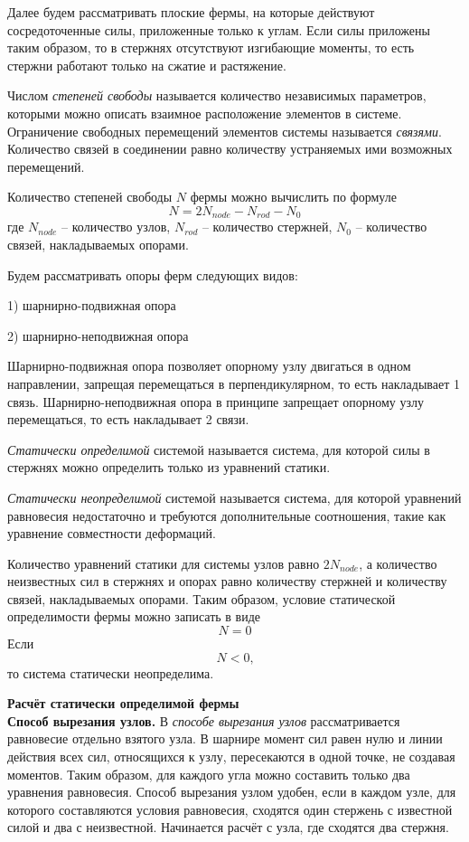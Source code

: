 \documentclass[a4paper,12pt]{article}
\begin{document}
Далее будем рассматривать плоские фермы, на которые действуют сосредоточенные силы, приложенные только к углам. Если силы приложены таким образом, то в стержнях отсутствуют изгибающие моменты, то есть стержни работают только на сжатие и растяжение.

Числом \textit{степеней свободы} называется количество независимых параметров, которыми можно описать взаимное расположение элементов в системе. Ограничение свободных перемещений элементов системы называется \textit{связями}. Количество связей в соединении равно количеству устраняемых ими возможных перемещений.

Количество степеней свободы $N$ фермы можно вычислить по формуле
\[N = 2N_{node} - N_{rod} - N_0\]
где $N_{node}$ -- количество узлов, $N_{rod}$ -- количество стержней, $N_0$ -- количество связей, накладываемых опорами.

Будем рассматривать опоры ферм следующих видов: \par
1) шарнирно-подвижная опора \par
2) шарнирно-неподвижная опора \par
Шарнирно-подвижная опора позволяет опорному узлу двигаться в одном направлении, запрещая перемещаться в перпендикулярном, то есть накладывает 1 связь. Шарнирно-неподвижная опора в принципе запрещает опорному узлу перемещаться, то есть накладывает 2 связи.

\textit{Статически определимой} системой называется система, для которой силы в стержнях можно определить только из уравнений статики. 

\textit{Статически неопределимой} системой называется система, для которой уравнений равновесия недостаточно и требуются дополнительные соотношения, такие как уравнение совместности деформаций.

Количество уравнений статики для системы узлов равно $2N_{node}$, а количество неизвестных сил в стержнях и опорах равно количеству стержней и количеству связей, накладываемых опорами. Таким образом, условие статической определимости фермы можно записать в виде
\[N = 0\]
Если 
\[N < 0\text{,}\]
то система статически неопределима.


\textbf{Расчёт статически определимой фермы}\\
\textbf{Способ вырезания узлов.} В \textit{способе вырезания узлов} рассматривается равновесие отдельно взятого узла. В шарнире момент сил равен нулю и линии действия всех сил, относящихся к узлу, пересекаются в одной точке, не создавая моментов. Таким образом, для каждого угла можно составить только два уравнения равновесия. Способ вырезания узлом удобен, если в каждом узле, для которого составляются условия равновесия, сходятся один стержень с известной силой и два с неизвестной. Начинается расчёт с узла, где сходятся два стержня.
\end{document}
